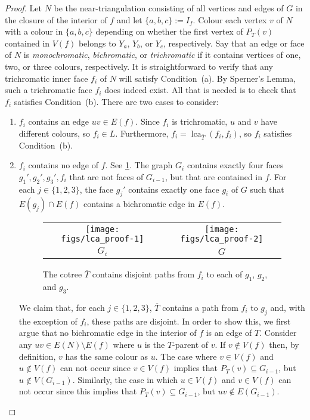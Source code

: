 \documentclass{patmorin}
\DeclareMathOperator{\lca}{lca}
\begin{document}
\begin{proof}
  Let $N$ be the near-triangulation consisting of all vertices and edges of $G$ in the closure of the interior of $f$ and let $\{a,b,c\}:=I_f$.  Colour each vertex $v$ of $N$ with a colour in $\{a,b,c\}$ depending on whether the first vertex of $P_{T}(v)$ contained in $V(f)$ belongs to $Y_a$, $Y_b$, or $Y_c$, respectively.  Say that an edge or face of $N$ is \emph{monochromatic}, \emph{bichromatic}, or \emph{trichromatic} if it contains vertices of one, two, or three colours, respectively.  It is straightforward to verify that any trichromatic inner face $f_i$ of $N$ will satisfy Condition~(a). By Sperner's Lemma, such a trichromatic face $f_i$ does indeed exist. All that is needed is to check that $f_i$ satisfies Condition~(b).  There are two cases to consider:
  \begin{enumerate}
    \item $f_i$ contains an edge $uv\in E(f)$.  Since $f_i$ is trichromatic,  $u$ and $v$ have different colours, so $f_i\in L$.  Furthermore, $f_i=\lca_{\overline{T}}(f_i,f_i)$, so $f_i$ satisfies Condition~(b).

    \item $f_i$ contains no edge of $f$.  See \cref{lca_proof}.  The graph $G_i$ contains exactly four faces $g_1',g_2',g_3',f_i$ that are not faces of $G_{i-1}$, but that are contained in $f$. For each $j\in\{1,2,3\}$, the face $g_j'$ contains exactly one face $g_i$ of $G$ such that $E(g_j)\cap E(f)$ contains a bichromatic edge in $E(f)$.

    \begin{figure}
      \begin{center}
        \begin{tabular}{cc}
          \texttt{[image: figs/lca\_proof-1]} &
          \texttt{[image: figs/lca\_proof-2]} \\
          $G_i$ & $G$
        \end{tabular}
      \end{center}
      \caption{The cotree $\overline{T}$ contains disjoint paths from $f_i$ to each of $g_1$, $g_2$, and $g_3$.}
      \label{lca_proof}
    \end{figure}

    We claim that, for each $j\in\{1,2,3\}$, $\overline{T}$ contains a path from $f_i$ to $g_j$ and, with the exception of $f_i$, these paths are disjoint.  In order to show this, we first argue that no bichromatic edge in the interior of $f$ is an edge of $T$.  Consider any $uv\in E(N)\setminus E(f)$ where $u$ is the $T$-parent of $v$.  If $v\not\in V(f)$ then, by definition, $v$ has the same colour as $u$. The case where $v\in V(f)$ and $u\not\in V(f)$ can not occur since $v\in V(f)$ implies that $P_T(v)\subseteq G_{i-1}$, but $u\not\in V(G_{i-1})$.  Similarly, the case in which $u\in V(f)$ and $v\in V(f)$ can not occur since this implies that $P_T(v)\subseteq G_{i-1}$, but $uv\not\in E(G_{i-1})$.


\end{enumerate}
\end{proof}
\end{document}
